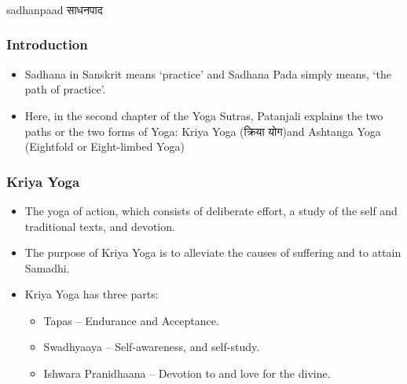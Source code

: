 \begin{frame}[fragile]\frametitle{}
\begin{center}
{\Large sadhanpaad साधनपाद}
\end{center}
\end{frame}


\begin{frame}[fragile]\frametitle{Introduction}


	\begin{itemize}
	\item Sadhana in Sanskrit means `practice' and Sadhana Pada simply means, `the path of practice'. 	\item Here, in the second chapter of the Yoga Sutras, Patanjali explains the two paths or the two forms of Yoga: Kriya Yoga (क्रिया योग)and Ashtanga Yoga (Eightfold or Eight-limbed Yoga)
	\end{itemize}

\end{frame}

\begin{frame}[fragile]\frametitle{Kriya Yoga}


	\begin{itemize}
	\item The yoga of action, which consists of deliberate effort, a study of the self and traditional texts, and devotion. 
	\item The purpose of Kriya Yoga is to alleviate the causes of suffering and to attain Samadhi. 
	\item Kriya Yoga has three parts:
		\begin{itemize}
		\item Tapas – Endurance and Acceptance.
		\item Swadhyaaya – Self-awareness, and self-study.
		\item Ishwara Pranidhaana – Devotion to and love for the divine.
		\end{itemize}	
	\end{itemize}

\end{frame}

